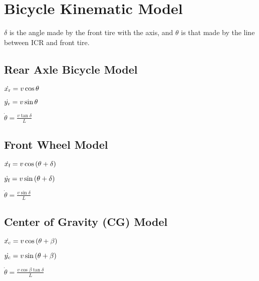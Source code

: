 \documentclass[titlepage, 12pt]{article}
\begin{document}
	\section{Bicycle Kinematic Model}
	
	$\delta$ is the angle made by the front tire with the axis, and $\theta$ is that made by the line between ICR and front tire.
	
	\subsection{Rear Axle Bicycle Model}
	
	$
	\dot{x\textsubscript{r}}
	=
	v\cos{\theta}
	$

	$
	\dot{y\textsubscript{r}}
	=
	v\sin{\theta}
	$
	
	$
	\dot{\theta}
	=
	\frac{v\tan{\delta}}{L}
	$

	\subsection{Front Wheel Model}
	
	$
	\dot{x\textsubscript{f}}
	=
	v\cos{(\theta+\delta)}
	$
	
	$
	\dot{y\textsubscript{f}}
	=
	v\sin{(\theta+\delta)}
	$
	
	$
	\dot{\theta}
	=
	\frac{v\sin{\delta}}{L}
	$

	\subsection{Center of Gravity (CG) Model}
	
	$
	\dot{x\textsubscript{c}}
	=
	v\cos{(\theta+\beta)}
	$
	
	$
	\dot{y\textsubscript{c}}
	=
	v\sin{(\theta+\beta)}
	$
	
	$
	\dot{\theta}
	=
	\frac{v\cos{\beta}\tan{\delta}}{L}
	$
	
\end{document}
